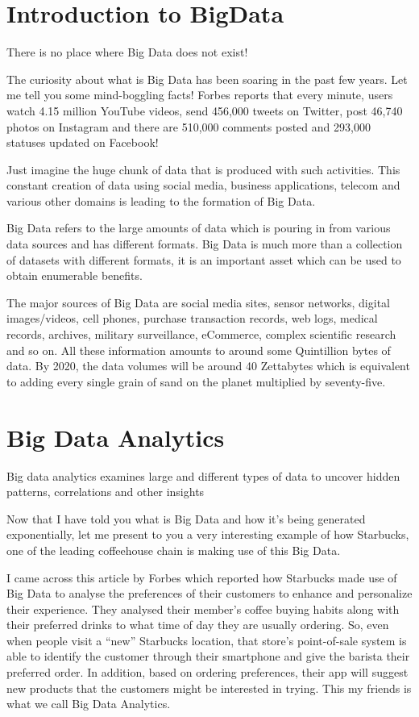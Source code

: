 \section{Introduction to BigData}

There is no place where Big Data does not exist!

 The curiosity about what is Big Data has been soaring in the past few years. Let me tell you some mind-boggling facts! Forbes reports that every minute, users watch 4.15 million YouTube videos, send 456,000 tweets on Twitter, post 46,740 photos on Instagram and there are 510,000 comments posted and 293,000 statuses updated on Facebook!

Just imagine the huge chunk of data that is produced with such activities. This constant creation of data using social media, business applications, telecom and various other domains is leading to the formation of Big Data.

 Big Data refers to the large amounts of data which is pouring in from various data sources and has different formats.
Big Data is much more than a collection of datasets with different formats, it is an important asset which can be used to obtain enumerable benefits.

  The major sources of Big Data are social media sites, sensor networks, digital images/videos, cell phones, purchase transaction records, web logs, medical records, archives, military surveillance, eCommerce, complex scientific research and so on. All these information amounts to around some Quintillion bytes of data. By 2020, the data volumes will be around 40 Zettabytes which is equivalent to adding every single grain of sand on the planet multiplied by seventy-five.
  
  \section{Big Data Analytics}
  Big data analytics examines large and different types of data to uncover hidden patterns, correlations and other insights
  
  
  Now that I have told you what is Big Data and how it’s being generated exponentially, let me present to you a very interesting example of how Starbucks, one of the leading coffeehouse chain is making use of this Big Data.

I came across this article by Forbes which reported how Starbucks made use of Big Data to analyse the preferences of their customers to enhance and personalize their experience. They analysed their member’s coffee buying habits along with their preferred drinks to what time of day they are usually ordering. So, even when people visit a “new” Starbucks location, that store’s point-of-sale system is able to identify the customer through their smartphone and give the barista their preferred order. In addition, based on ordering preferences, their app will suggest new products that the customers might be interested in trying. This my friends is what we call Big Data Analytics.

